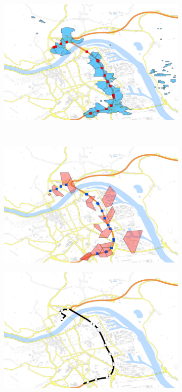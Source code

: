 \documentclass[master,english]{hgbthesis}
\begin{document}
\begin{figure}
	\centering
	\begin{subfigure}[b]{0.5\linewidth}
		\includegraphics[width=\textwidth]{./images/1058_Coverage_Handover}
		\caption{}
		\label{fig:1058_coverage}
	\end{subfigure}%
	~
	\begin{subfigure}[b]{0.5\linewidth}
		\includegraphics[width=\textwidth]{./images/1058_Voronoi_Handover}
		\caption{}
		\label{fig:1058_voronoi}
	\end{subfigure}
	\begin{subfigure}[b]{0.5\linewidth}
			\includegraphics[width=\textwidth]{./images/1058_Handover}

\end{subfigure}
\end{figure}
\end{document}
